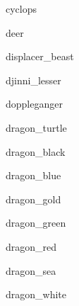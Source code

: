 \documentclass[letterpaper,serif]{module}
\begin{document}
\begin{newmonster}{cyclops}\end{newmonster}

\begin{newmonster}{deer}\end{newmonster}

\begin{newmonster}{displacer_beast}\end{newmonster}

\begin{newmonster}{djinni_lesser}\end{newmonster}

\begin{newmonster}{doppleganger}\end{newmonster}

\begin{newmonster}{dragon_turtle}\end{newmonster}

\begin{newmonster}{dragon_black}\end{newmonster}

\begin{newmonster}{dragon_blue}\end{newmonster}

\begin{newmonster}{dragon_gold}\end{newmonster}

\begin{newmonster}{dragon_green}\end{newmonster}

\begin{newmonster}{dragon_red}\end{newmonster}

\begin{newmonster}{dragon_sea}\end{newmonster}

\begin{newmonster}{dragon_white}\end{newmonster}
\end{document}
